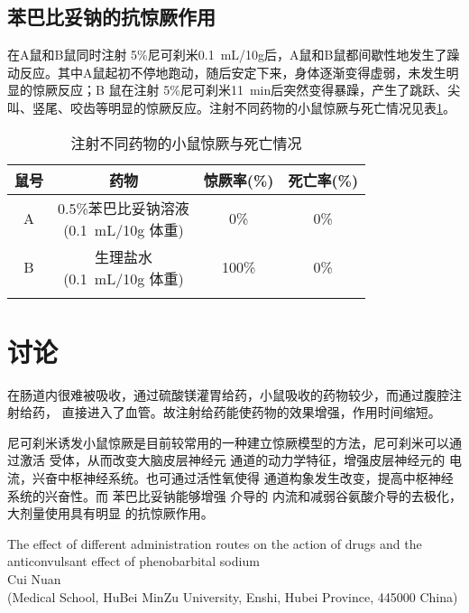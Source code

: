 \documentclass[lang=cn,11pt,a4paper,cite=super,AutoFakeBold,chinesefont=founder]{elegantpaper}
\begin{document}
\subsection{苯巴比妥钠的抗惊厥作用}

在A鼠和B鼠同时注射 5\%尼可刹米\SI{0.1}{mL/10g}后，A鼠和B鼠都间歇性地发生了躁动反应。其中A鼠起初不停地跑动，随后安定下来，身体逐渐变得虚弱，未发生明显的惊厥反应；B 鼠在注射 5\%尼可刹米\SI{11}{min}后突然变得暴躁，产生了跳跃、尖叫、竖尾、咬齿等明显的惊厥反应。注射不同药物的小鼠惊厥与死亡情况见表\ref{tabular:2}。

\begin{table}[!ht]
\caption{注射不同药物的小鼠惊厥与死亡情况}
	\centering
	\begin{tabular}{*4{c}}
	\toprule
	鼠号 & 药物               & 惊厥率(\%) & 死亡率(\%) \\
	\midrule
	A & \makecell[c]{0.5\%苯巴比妥钠溶液 \\ (\SI{0.1}{mL/10g} 体重)} & 0\% 		& 0\% \\
	B & \makecell[c]{生理盐水 \\ (\SI{0.1}{mL/10g} 体重)}           & 100\%   & 0\% \\
	\bottomrule
	\label{tabular:2}
	\end{tabular}
\end{table}

\section{讨论}

 在肠道内很难被吸收，通过硫酸镁灌胃给药，小鼠吸收的药物较少，而通过腹腔注射给药， 直接进入了血管。故注射给药能使药物的效果增强，作用时间缩短。

尼可刹米诱发小鼠惊厥是目前较常用的一种建立惊厥模型的方法，尼可刹米可以通过激活  受体，从而改变大脑皮层神经元  通道的动力学特征，增强皮层神经元的  电流，兴奋中枢神经系统\cite{cn3}。也可通过活性氧使得  通道构象发生改变，提高中枢神经系统的兴奋性。而 苯巴比妥钠能够增强  介导的  内流和减弱谷氨酸介导的去极化，大剂量使用具有明显 的抗惊厥作用。



\begin{center}
    \Large
    The effect of different administration routes on the action of drugs and the anticonvulsant effect of phenobarbital sodium
    \\[8pt]
    \normalsize
    Cui Nuan
    \\[8pt]
    \small
    (Medical School, HuBei MinZu University, Enshi, Hubei Province, 445000 China)
\end{center}
\end{document}
